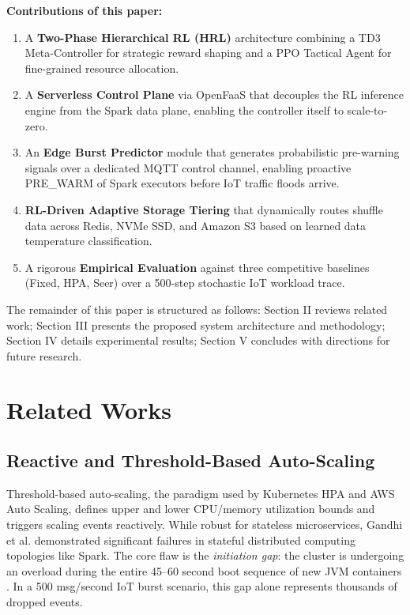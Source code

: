 \documentclass[10pt, conference, compsocconf]{IEEEtran}
\begin{document}
\textbf{Contributions of this paper:}
\begin{enumerate}
    \item A \textbf{Two-Phase Hierarchical RL (HRL)} architecture combining a TD3 Meta-Controller for strategic reward shaping and a PPO Tactical Agent for fine-grained resource allocation.
    \item A \textbf{Serverless Control Plane} via OpenFaaS that decouples the RL inference engine from the Spark data plane, enabling the controller itself to scale-to-zero.
    \item An \textbf{Edge Burst Predictor} module that generates probabilistic pre-warning signals over a dedicated MQTT control channel, enabling proactive PRE\_WARM of Spark executors before IoT traffic floods arrive.
    \item \textbf{RL-Driven Adaptive Storage Tiering} that dynamically routes shuffle data across Redis, NVMe SSD, and Amazon S3 based on learned data temperature classification.
    \item A rigorous \textbf{Empirical Evaluation} against three competitive baselines (Fixed, HPA, Seer) over a 500-step stochastic IoT workload trace.
\end{enumerate}

The remainder of this paper is structured as follows: Section II reviews related work; Section III presents the proposed system architecture and methodology; Section IV details experimental results; Section V concludes with directions for future research.

\section{Related Works}

\subsection{Reactive and Threshold-Based Auto-Scaling}

Threshold-based auto-scaling, the paradigm used by Kubernetes HPA and AWS Auto Scaling, defines upper and lower CPU/memory utilization bounds and triggers scaling events reactively. While robust for stateless microservices, Gandhi et al. \cite{gandhi2018} demonstrated significant failures in stateful distributed computing topologies like Spark. The core flaw is the \textit{initiation gap}: the cluster is undergoing an overload during the entire 45--60 second boot sequence of new JVM containers \cite{eismann2021serverless}. In a 500 msg/second IoT burst scenario, this gap alone represents thousands of dropped events.
\end{document}
